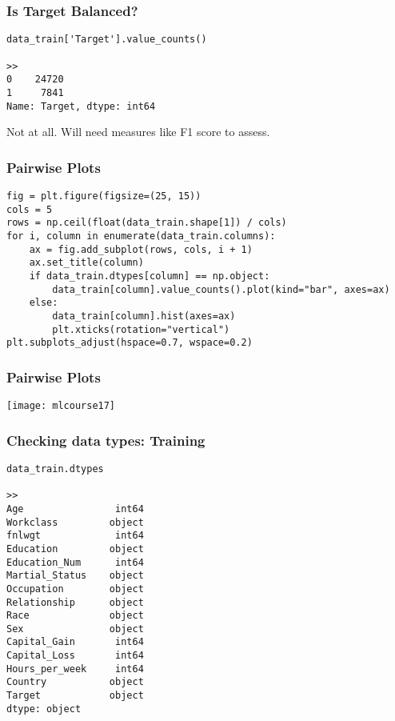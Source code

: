 \begin{frame}[fragile]\frametitle{Is Target Balanced?}	
\begin{lstlisting}
data_train['Target'].value_counts()

>>
0    24720
1     7841
Name: Target, dtype: int64
\end{lstlisting}
Not at all. Will need measures like F1 score to assess.
\end{frame}

\begin{frame}[fragile]\frametitle{Pairwise Plots}	
\begin{lstlisting}
fig = plt.figure(figsize=(25, 15))
cols = 5
rows = np.ceil(float(data_train.shape[1]) / cols)
for i, column in enumerate(data_train.columns):
    ax = fig.add_subplot(rows, cols, i + 1)
    ax.set_title(column)
    if data_train.dtypes[column] == np.object:
        data_train[column].value_counts().plot(kind="bar", axes=ax)
    else:
        data_train[column].hist(axes=ax)
        plt.xticks(rotation="vertical")
plt.subplots_adjust(hspace=0.7, wspace=0.2)
\end{lstlisting}
\end{frame}

\begin{frame}[fragile]\frametitle{Pairwise Plots}	
\begin{center}
\texttt{[image: mlcourse17]}
\end{center}
\end{frame}

\begin{frame}[fragile]\frametitle{Checking data types: Training}	
\begin{lstlisting}
data_train.dtypes

>>
Age                int64
Workclass         object
fnlwgt             int64
Education         object
Education_Num      int64
Martial_Status    object
Occupation        object
Relationship      object
Race              object
Sex               object
Capital_Gain       int64
Capital_Loss       int64
Hours_per_week     int64
Country           object
Target            object
dtype: object
\end{lstlisting}
\end{frame}

